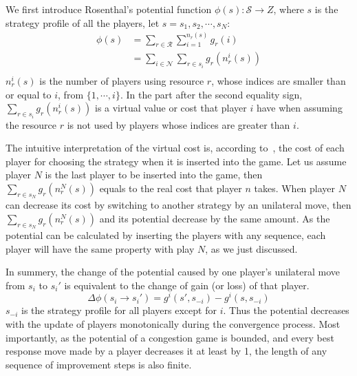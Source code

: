 We first introduce Rosenthal's potential function $\phi(s):\mathcal{S}\rightarrow Z$, where $s$ is the strategy profile of all the players, let $s = s_1, s_2,\cdots, s_N$:
\begin{equation}
\label{4}
\begin{split}
\phi(s) 
& =\sum\limits^{}_{r\in \mathcal{R}} \sum\limits^{n_r(s)}_{i=1} g_r(i)\\
& =\sum\limits_{i\in \mathcal{N}} \sum\limits^{}_{r\in s_i} g_r(n_r^i(s))\\
\end{split}
\end{equation}
$n_r^i(s)$ is the number of players using resource $r$, whose indices are smaller than or equal to $i$, \ie from $\{1,\cdots,i\}$. 
In the part after the second equality sign, $\sum\limits^{}_{r\in s_i} g_r(n_r^i(s))$ is a virtual value or cost that player $i$ have when assuming the resource $r$ is not used by players whose indices are greater than $i$.

The intuitive interpretation of the virtual cost is, according to~\cite{Voecking06congestiongames}, the cost of each player for choosing the strategy when it is inserted into the game.
Let us assume player $N$ is the last player to be inserted into the game, then $\sum\limits^{}_{r\in s_N} g_r(n_r^N(s))$ equals to the real cost that player $n$ takes.
When player $N$ can decrease its cost by switching to another strategy by an unilateral move, then $\sum\limits^{}_{r\in s_N} g_r(n_r^N(s))$ and its potential decrease by the same amount.
As the potential can be calculated by inserting the players with any sequence, each player will have the same property with play $N$, as we just discussed.

In summery, the change of the potential caused by one player's unilateral move from $s_i$ to $s_i'$ is equivalent to the change of gain (or loss) of that player.
\begin{equation}
\label{5}
\varDelta \phi(s_i \rightarrow s_i') = g^i(s',s_{-i}) - g^i(s,s_{-i})
\end{equation}
$s_{-i}$ is the strategy profile for all players except for $i$.
Thus the potential decreases with the update of players monotonically during the convergence process.
Most importantly, as the potential of a congestion game is bounded, and every best response move made by a player decreases it at least by 1, the length of any sequence of improvement steps is also finite.



